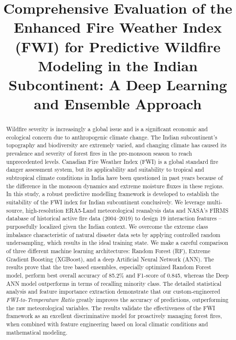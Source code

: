 \documentclass[journal, 10pt, twocolumn]{IEEEtran}
\begin{document}
\title{Comprehensive Evaluation of the Enhanced Fire Weather Index (FWI) for Predictive Wildfire Modeling in the Indian Subcontinent: A Deep Learning and Ensemble Approach}

\author{
}

\maketitle

\begin{abstract}
Wildfire severity is increasingly a global issue and is a significant economic and ecological concern due to anthropogenic climate change. The Indian subcontinent's topography and biodiversity are extremely varied, and changing climate has caused its prevalence and severity of forest fires in the pre-monsoon season to reach unprecedented levels. Canadian Fire Weather Index (FWI) is a global standard fire danger assessment system, but its applicability and suitability to tropical and subtropical climate conditions in India have been questioned in past years because of the difference in the monsoon dynamics and extreme moisture fluxes in these regions. In this study, a robust predictive modelling framework is developed to establish the suitability of the FWI index for Indian subcontinent conclusively. We leverage multi-source, high-resolution ERA5-Land meteorological reanalysis data and NASA's FIRMS database of historical active fire data (2004--2019) to design 19 interaction features – purposefully localized given the Indian context. We overcome the extreme class imbalance characteristic of natural disaster data sets by applying controlled random undersampling, which results in the ideal training state. We make a careful comparison of three different machine learning architectures: Random Forest (RF), Extreme Gradient Boosting (XGBoost), and a deep Artificial Neural Network (ANN). The results prove that the tree based ensembles, especially optimized Random Forest model, perform best overall accuracy of 85.2\% and F1-score of 0.845, whereas the Deep ANN model outperforms in terms of recalling minority class. The detailed statistical analysis and feature importance extraction demonstrate that our custom-engineered \textit{FWI-to-Temperature Ratio} greatly improves the accuracy of predictions, outperforming the raw meteorological variables. The results validate the effectiveness of the FWI framework as an excellent discriminative model for proactively managing forest fires, when combined with feature engineering based on local climatic conditions and mathematical modeling.
\end{abstract}
\end{document}
